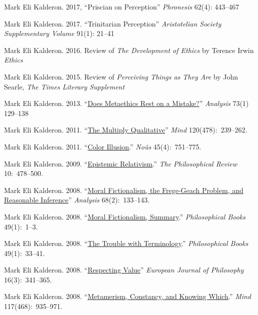 \documentclass[11pt]{article}
\begin{document}
\ind Mark Eli Kalderon. 2017, ``Priscian on Perception'' \emph{Phronesis} 62(4): 443--467

\ind Mark Eli Kalderon. 2017. ``Trinitarian Perception'' \emph{Aristotelian Society Supplementary Volume} 91(1): 21--41

\ind Mark Eli Kalderon. 2016. Review of \emph{The Development of Ethics} by Terence Irwin \emph{Ethics}

\ind Mark Eli Kalderon. 2015. Review of \emph{Perceiving Things as They Are} by John Searle, \emph{The Times Literary Supplement}

\ind Mark Eli Kalderon. 2013. ``\href{http://dx.doi.org/10.1093/analys/ans147}{Does Metaethics Rest on a Mistake?}'' \emph{Analysis} 73(1) 129--138

\ind Mark Eli Kalderon. 2011. ``\href{http://mind.oxfordjournals.org/content/120/478/239.full.pdf+html}{The Multiply Qualitative}'' \emph{Mind} 120(478):~239--262. 

\ind Mark Eli Kalderon. 2011. ``\href{http://onlinelibrary.wiley.com/doi/10.1111/j.1468-0068.2010.00781.x/pdf}{Color Illusion}.''
 \emph{No{\^u}s} 45(4):~751--775.

\ind Mark Eli Kalderon. 2009. ``\href{http://philreview.dukejournals.org/content/118/2/225.full.pdf+html}{Epistemic Relativism}.'' \emph{The Philosophical Review} 10:~478--500. 

\ind Mark Eli Kalderon. 2008. ``\href{http://onlinelibrary.wiley.com/doi/10.1111/j.1467-8284.2007.00728.x/full}{Moral Fictionalism, the Frege-Geach Problem, and Reasonable Inference}'' \emph{Analysis} 68(2):~133--143. 


\ind Mark Eli Kalderon. 2008. ``\href{http://onlinelibrary.wiley.com/doi/10.1111/j.1468-0149.2008.454_1.x/pdf}{Moral Fictionalism, Summary}.'' \emph{Philosophical Books} 49(1):~1--3.


\ind Mark Eli Kalderon. 2008.  ``\href{http://onlinelibrary.wiley.com/doi/10.1111/j.1468-0149.2008.454_5.x/abstract}{The Trouble with Terminology}.'' \emph{Philosophical Books} 49(1):~33--41.


\ind Mark Eli Kalderon. 2008. ``\href{http://onlinelibrary.wiley.com/doi/10.1111/j.1468-0378.2008.00324.x/pdf}{Respecting Value}''  \emph{European Journal of Philosophy}
16(3):~341--365.


\ind  Mark Eli Kalderon. 2008.  ``\href{http://mind.oxfordjournals.org/content/117/468/935.full.pdf+html}{Metamerism, Constancy, and Knowing Which}.'' \emph{Mind} 117(468):~935--971. 
\end{document}
